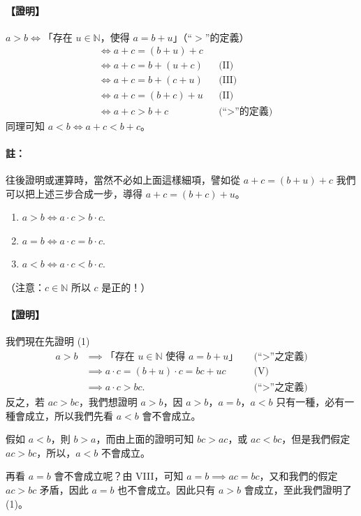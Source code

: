 \paragraph{【證明】}$a > b \iff$「存在 $u \in \mathbb{N}$，使得 $a=b+u$」（“$>$”的定義）
\begin{align*}
  &\iff a+c = (b+u)+c \\
  &\iff a+c = b+(u+c) && \text{(II)} \\
  &\iff a+c = b+(c+u) && \text{(III)} \\
  &\iff a+c = (b+c)+u && \text{(II)} \\
  &\iff a+c > b+c && \text{(“$>$”的定義)}
\end{align*}
同理可知 $a < b \iff a+c < b+c$。

\paragraph{註：}往後證明或運算時，當然不必如上面這樣細項，譬如從 $a+c=(b+u)+c$ 我們可以把上述三步合成一步，導得 $a+c=(b+c)+u$。

\medskip
{}\label{prop:nat_xii}
\begin{enumerate}[(1)]
  \item $a > b \iff a \cdot c > b \cdot c$.
  \item $a = b \iff a \cdot c = b \cdot c$.
  \item $a < b \iff a \cdot c < b \cdot c$.
\end{enumerate}
（注意：$c \in \mathbb{N}$ 所以 $c$ 是正的！）

\paragraph{【證明】}我們現在先證明 (1)
\begin{align*}
  a > b &\implies \text{「存在 } u \in \mathbb{N} \text{ 使得 } a=b+u\text{」} && \text{(“$>$”之定義)} \\
  &\implies a \cdot c = (b+u) \cdot c = bc + uc && \text{(V)} \\
  &\implies a \cdot c > bc. && \text{(“$>$”之定義)}
\end{align*}
反之，若 $ac > bc$，我們想證明 $a > b$，因 $a > b$，$a = b$，$a < b$ 只有一種，必有一種會成立，所以我們先看 $a < b$ 會不會成立。

假如 $a < b$，則 $b > a$，而由上面的證明可知 $bc > ac$，或 $ac < bc$，但是我們假定 $ac > bc$，所以，$a < b$ 不會成立。

再看 $a = b$ 會不會成立呢？由 VIII，可知 $a = b \implies ac = bc$，又和我們的假定 $ac > bc$ 矛盾，因此 $a = b$ 也不會成立。因此只有 $a > b$ 會成立，至此我們證明了 (1)。

